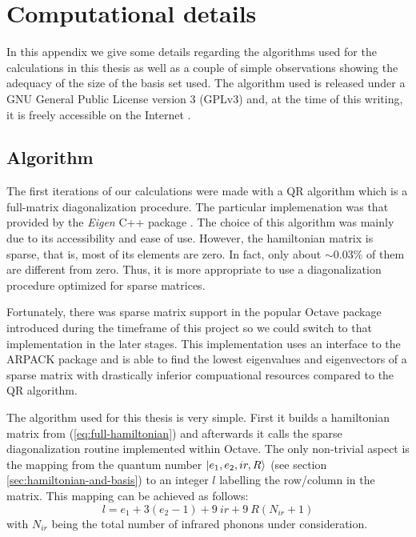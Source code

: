 \chapter{Computational details}
\label{chap:comp_details}

In this appendix we give some details regarding the algorithms used for the calculations in this thesis as well as a couple of simple observations showing the adequacy of the size of the basis set used.
The algorithm used is released under a GNU General Public License version 3 (GPLv3) and, at the time of this writing, it is freely accessible on the Internet \cite{polaronsGitHub2014}.

\section{Algorithm}
\label{sec:algorithm}

The first iterations of our calculations were made with a QR algorithm  which is a full-matrix diagonalization procedure.
The particular implemenation was that provided by the \textit{Eigen} C++ package \cite{eigenweb}.
The choice of this algorithm was mainly due to its accessibility and ease of use. 
However, the hamiltonian matrix is sparse, that is, most of its elements are zero.
In fact, only about $\sim 0.03\%$ of them are different from zero.
Thus, it is more appropriate to use a diagonalization procedure optimized for sparse matrices.

Fortunately, there was sparse matrix support \cite{Bateman2006} in the popular Octave package \cite{Octave2014} introduced during the timeframe of this project so we could switch to that implementation in the later stages.
This implementation uses an interface to the ARPACK package \cite{LehoucqARPACK1997} and is able to find the lowest eigenvalues and eigenvectors of a sparse matrix with drastically inferior compuational resources compared to the QR algorithm.

The algorithm used for this thesis \cite{polaronsGitHub2014} is very simple.
First it builds a hamiltonian matrix from (\ref{eq:full-hamiltonian}) and afterwards it calls the sparse diagonalization routine implemented within Octave.
The only non-trivial aspect is the mapping from the quantum number $\left | e_1,e_2,ir,R \right\rangle$ (see section \ref{sec:hamiltonian-and-basis}) to an integer $l$ labelling the row/column in the matrix.
This mapping can be achieved as follows:
%
\begin{equation}
  \label{eq:label}
  l = e_1 + 3(e_2 - 1) + 9\ ir + 9\ R (N_{ir} +1)
\end{equation}
%
with $N_{ir}$ being the total number of infrared phonons under consideration.

